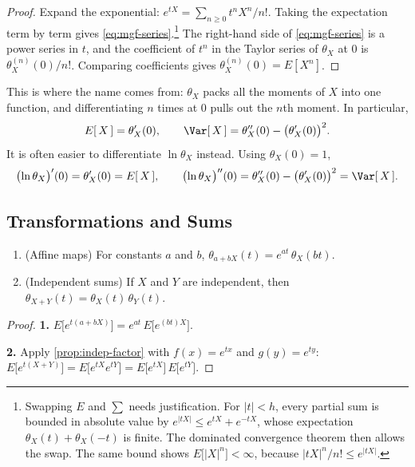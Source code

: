 \begin{proof}
	Expand the exponential: $e^{tX}=\sum_{n\ge0}t^{n}X^{n}/n!$.
	Taking the expectation term by term gives \eqref{eq:mgf-series}.\footnote{Swapping $E$ and $\sum$ needs justification. For $|t|<h$, every partial sum is bounded in absolute value by $e^{|tX|}\le e^{tX}+e^{-tX}$, whose expectation $\theta_{X}(t)+\theta_{X}(-t)$ is finite. The dominated convergence theorem then allows the swap. The same bound shows $E\bigl[|X|^{n}\bigr]<\infty$, because $|tX|^{n}/n!\le e^{|tX|}$.}
	The right-hand side of \eqref{eq:mgf-series} is a power series in $t$, and the coefficient of $t^{n}$ in the Taylor series of $\theta_{X}$ at $0$ is $\theta_{X}^{(n)}(0)/n!$.
	Comparing coefficients gives $\theta_{X}^{(n)}(0)=E[X^{n}]$.
\end{proof}

This is where the name comes from: $\theta_{X}$ packs all the moments of $X$ into one function, and differentiating $n$ times at $0$ pulls out the $n$th moment.
In particular,
\[
	E[\,X\,]=\theta_{X}'(0) ,
	\qquad
	\Var[\,X\,]=\theta_{X}''(0)-\bigl(\theta_{X}'(0)\bigr)^{2} .
\]
It is often easier to differentiate $\ln\theta_{X}$ instead.
Using $\theta_{X}(0)=1$,
\begin{equation}
	\bigl(\ln\theta_{X}\bigr)'(0)=\theta_{X}'(0)=E[\,X\,] ,
	\qquad
	\bigl(\ln\theta_{X}\bigr)''(0)=\theta_{X}''(0)-\bigl(\theta_{X}'(0)\bigr)^{2}=\Var[\,X\,] . \label{eq:mgf-log}
\end{equation}

\subsection{Transformations and Sums}

\begin{proposition}\label{prop:mgf-algebra}
	\begin{enumerate}[nosep]
		\item (Affine maps) For constants $a$ and $b$, $\theta_{a+bX}(t)=e^{at}\,\theta_{X}(bt)$.
		\item (Independent sums) If $X$ and $Y$ are independent, then $\theta_{X+Y}(t)=\theta_{X}(t)\,\theta_{Y}(t)$.
	\end{enumerate}
\end{proposition}

\begin{proof}
	\textbf{1.} $E\bigl[e^{t(a+bX)}\bigr]=e^{at}\,E\bigl[e^{(bt)X}\bigr]$.

	\textbf{2.} Apply \autoref{prop:indep-factor} with $f(x)=e^{tx}$ and $g(y)=e^{ty}$:
	$E\bigl[e^{t(X+Y)}\bigr]=E\bigl[e^{tX}e^{tY}\bigr]=E\bigl[e^{tX}\bigr]\,E\bigl[e^{tY}\bigr]$.
\end{proof}

